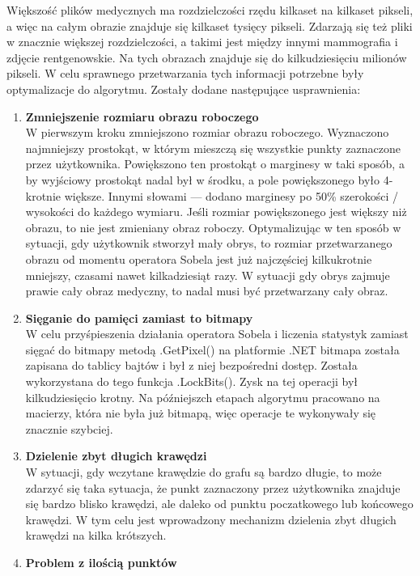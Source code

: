 \documentclass[a4paper,11pt,twoside]{report}
\theoremstyle{definition}
\begin{document}
Większość plików medycznych ma rozdzielczości rzędu kilkaset na kilkaset pikseli, a więc na całym obrazie znajduje się kilkaset tysięcy pikseli. Zdarzają się też pliki w znacznie większej rozdzielczości, a takimi jest między innymi mammografia i zdjęcie rentgenowskie. Na tych obrazach znajduje się do kilkudziesięciu milionów pikseli. W celu sprawnego przetwarzania tych informacji potrzebne były optymalizacje do algorytmu. Zostały dodane następujące usprawnienia:
\begin{enumerate}
\item \textbf {Zmniejszenie rozmiaru obrazu roboczego} \\
W pierwszym kroku zmniejszono rozmiar obrazu roboczego. Wyznaczono najmniejszy prostokąt, w którym mieszczą się wszystkie punkty zaznaczone przez użytkownika. Powiększono ten prostokąt o marginesy w taki sposób, a by wyjściowy prostokąt nadal był w środku, a pole powiększonego było 4-krotnie większe. Innymi słowami --- dodano marginesy po 50\% szerokości / wysokości do każdego wymiaru. Jeśli rozmiar powiększonego jest większy niż obrazu, to nie jest zmieniany obraz roboczy.
Optymalizując w ten sposób w sytuacji, gdy użytkownik stworzył mały obrys, to rozmiar przetwarzanego obrazu od momentu operatora Sobela jest już najczęściej kilkukrotnie mniejszy, czasami nawet kilkadziesiąt razy. W sytuacji gdy obrys zajmuje prawie cały obraz medyczny, to nadal musi być przetwarzany cały obraz.
\item \textbf {Sięganie do pamięci zamiast to bitmapy} \\
W celu przyśpieszenia działania operatora Sobela i liczenia statystyk zamiast sięgać do bitmapy metodą .GetPixel() na platformie .NET bitmapa została zapisana do tablicy bajtów i był z niej bezpośredni dostęp. Została wykorzystana do tego funkcja .LockBits(). Zysk na tej operacji był kilkudziesięcio krotny. Na późniejszch etapach algorytmu pracowano na macierzy, która nie była już bitmapą, więc operacje te wykonywały się znacznie szybciej. 
\item \textbf {Dzielenie zbyt długich krawędzi} \\
W sytuacji, gdy wczytane krawędzie do grafu są bardzo długie, to może zdarzyć się taka sytuacja, że punkt zaznaczony przez użytkownika znajduje się bardzo blisko krawędzi, ale daleko od punktu poczatkowego lub końcowego krawędzi. W tym celu jest wprowadzony mechanizm dzielenia zbyt długich krawędzi na kilka krótszych. 
\item \textbf {Problem z ilością punktów} \\

\end{enumerate}
\end{document}
